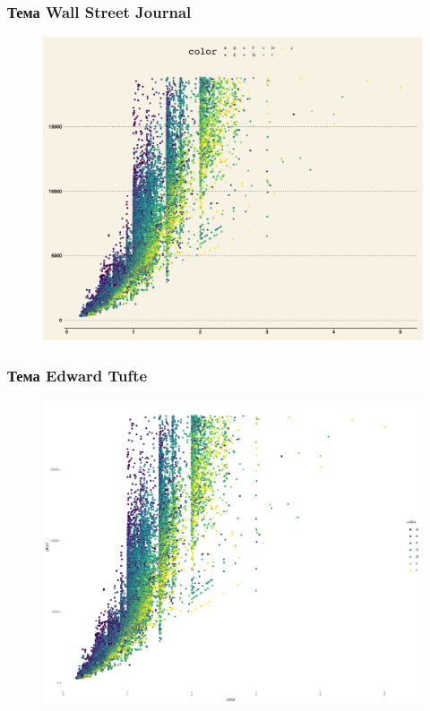 \documentclass{beamer}
\begin{document}
\begin{frame}
\frametitle{Тема Wall Street Journal}
\begin{figure}[]\includegraphics[width=\textwidth,height=0.75\textheight]{pic0043}\end{figure}
\end{frame}

\begin{frame}
\frametitle{Тема Edward Tufte}
\begin{figure}[]\includegraphics[width=\textwidth,height=0.75\textheight]{pic0044}\end{figure}
\end{frame}
\end{document}
